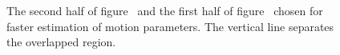 \begin{description}
\begin{figure}
{\label{fig:left}%
}
\qquad
{}%
\caption[Overlapping Area Prediction]{The second half of figure~ and the first half of figure~ chosen for faster estimation of motion parameters. The vertical line separates the overlapped region.}%
\label{fig:overlap-estimation}%
\end{figure}	
\end{description}

